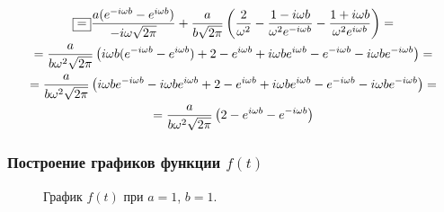 \documentclass[a5paper, 10pt]{article}
\theoremstyle{definition}
\theoremstyle{plain}
\theoremstyle{remark}
\begin{document}
\begin{multline}
\fbox{=} \frac{a ( e^{-i \omega b} -  e^{i \omega b})}{-i\omega \sqrt{2 \pi}} + \frac{a}{b\sqrt{2 \pi}} \left( \frac{2}{\omega^2} -
 \frac{1 - i \omega b}{\omega^2 e^{-i \omega b}} - \frac{1 + i \omega b}{\omega^2 e^{i \omega b}}  \right) =\\
=\frac{a}{b \omega^2 \sqrt{2 \pi}} \left( i\omega b (e^{-i \omega b} - e^{i \omega b}) + 2 - e^{i\omega b} + i \omega b e^{i\omega b} - e^{-i\omega b} - i \omega b e^{-i\omega b} \right) = \\
= \frac{a}{b \omega^2 \sqrt{2 \pi}} \left( i\omega b e^{-i \omega b} - i\omega b e^{i \omega b} + 2 - e^{i\omega b} + i \omega b e^{i\omega b} - e^{-i\omega b} - i \omega b e^{-i\omega b} \right) = \\
= \frac{a}{b \omega^2 \sqrt{2 \pi}} \left( 2 - e^{i\omega b}  - e^{-i\omega b} \right) 
\end{multline}


\subsubsection{Построение графиков функции $f(t)$}

\begin{figure}[h!]
\caption{График $f(t)$ при $a = 1$, $b = 1$.}
\end{figure}
\end{document}
